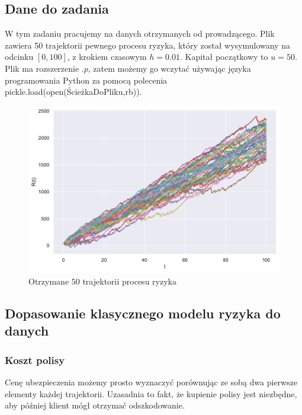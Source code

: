 \documentclass[12pt]{mwart}
\begin{document}
	
	
	\subsection{Dane do zadania}
	\noindent W tym zadaniu pracujemy na danych otrzymanych od prowadzącego. Plik zawiera 50 trajektorii pewnego procesu ryzyka, który został wysymulowany na odcinku $[0, 100]$, z krokiem czasowym $h = 0.01$. Kapitał początkowy to $u=50$. Plik ma rozszerzenie $.p$, zatem możemy go wczytać używając języka programowania Python za pomocą polecenia pickle.load(open(\textquotesingle ŚcieżkaDoPliku\textquotesingle ,\textquotesingle rb\textquotesingle)).
	
	\begin{figure}[H]
	\begin{center}
		\includegraphics[scale=0.5]{dane.pdf}
		\caption{Otrzymane $50$ trajektorii procesu ryzyka}
	\end{center}
	\end{figure}
	
	\subsection{Dopasowanie klasycznego modelu ryzyka do danych}
	\subsubsection{Koszt polisy}
	\noindent Cenę ubezpieczenia możemy prosto wyznaczyć porównując ze sobą dwa pierwsze elementy każdej trajektorii. Uzasadnia to fakt, że kupienie polisy jest niezbędne, aby później klient mógł otrzymać odszkodowanie. 
	
\end{document}
